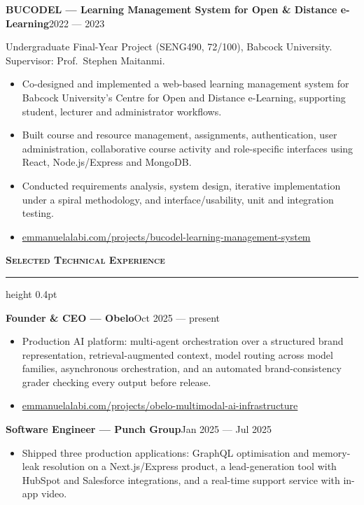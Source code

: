 \documentclass[10pt,a4paper]{article}
\newcommand{\cvsection}[1]{%
  \vspace{0.95em}%
  {\normalsize\bfseries\scshape #1}\par
  \vspace{0.25em}%
  \hrule height 0.4pt
  \vspace{0.6em}%
}
\newcommand{\cventry}[2]{%
  \textbf{#1}\hfill{\small #2}\par\vspace{0.15em}%
}
\newenvironment{cvitems}{%
  \begin{itemize}%
    \setlength{\itemsep}{0.12em}%
    \setlength{\parskip}{0pt}%
    \setlength{\parsep}{0pt}%
    \setlength{\topsep}{0.25em}%
    \setlength{\partopsep}{0pt}%
}{%
  \end{itemize}%
  \vspace{0.25em}%
}
\begin{document}
\cventry{BUCODEL --- Learning Management System for Open \& Distance e-Learning}{2022 --- 2023}
{\small Undergraduate Final-Year Project (SENG490, 72/100), Babcock University.
Supervisor: Prof.\ Stephen Maitanmi.}
\begin{cvitems}
  \item Co-designed and implemented a web-based learning management system for
        Babcock University's Centre for Open and Distance e-Learning, supporting
        student, lecturer and administrator workflows.
  \item Built course and resource management, assignments, authentication, user
        administration, collaborative course activity and role-specific
        interfaces using React, Node.js/Express and MongoDB.
  \item Conducted requirements analysis, system design, iterative implementation
        under a spiral methodology, and interface/usability, unit and
        integration testing.
  \item \href{https://emmanuelalabi.com/projects/bucodel-learning-management-system}{emmanuelalabi.com/projects/bucodel-learning-management-system}
\end{cvitems}

\cvsection{Selected Technical Experience}

\cventry{Founder \& CEO --- Obelo}{Oct 2025 --- present}
\begin{cvitems}
  \item Production AI platform: multi-agent orchestration over a structured
        brand representation, retrieval-augmented context, model routing across
        model families, asynchronous orchestration, and an automated
        brand-consistency grader checking every output before release.
  \item \href{https://www.emmanuelalabi.com/projects/obelo-multimodal-ai-infrastructure}{emmanuelalabi.com/projects/obelo-multimodal-ai-infrastructure}
\end{cvitems}

\cventry{Software Engineer --- Punch Group}{Jan 2025 --- Jul 2025}
\begin{cvitems}
  \item Shipped three production applications: GraphQL optimisation and
        memory-leak resolution on a Next.js/Express product, a lead-generation
        tool with HubSpot and Salesforce integrations, and a real-time support
        service with in-app video.
\end{cvitems}
\end{document}

